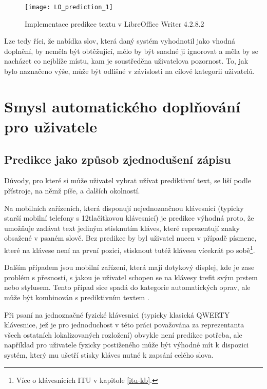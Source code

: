 \documentclass[a4paper,11pt]{article}
\begin{document}
\begin{figure}[h]
	\centering
	\texttt{[image: LO\_prediction\_1]}
	\caption{Implementace predikce textu v LibreOffice Writer 4.2.8.2}
	\label{fig:LOpredict}
\end{figure}

Lze tedy říci, že nabídka slov, která daný systém vyhodnotil jako vhodná doplnění, by neměla být obtěžující, mělo by být snadné ji ignorovat a měla by se nacházet co nejblíže místu, kam je soustředěna uživatelova pozornost. To, jak bylo naznačeno výše, může být odlišné v závislosti na cílové kategorii uživatelů.

\section{Smysl automatického doplňování pro uživatele}

\subsection{Predikce jako způsob zjednodušení zápisu}

Důvody, pro které si může uživatel vybrat užívat prediktivní text, se liší podle přístroje, na němž píše, a dalších okolností.

Na mobilních zařízeních, která disponují nejednoznačnou klávesnicí (typicky starší mobilní telefony s 12tlačítkovou klávesnicí) je predikce výhodná proto, že umožňuje zadávat text jediným stisknutím kláves, které reprezentují znaky obsažené v psaném slově. Bez predikce by byl uživatel nucen v případě písmene, které na klávese není na první pozici, stisknout tutéž klávesu vícekrát po sobě\footnote{Více o klávesnicích ITU v kapitole \ref{itu-kb}.}.

Dalším případem jsou mobilní zařízení, která mají dotykový displej, kde je zase problém s přesností, s jakou je uživatel schopen se na klávesy trefit svým prstem nebo stylusem. Tento případ sice spadá do kategorie automatických oprav, ale může být kombinován s prediktivním textem \parencite{kocienda2012method}. %

Při psaní na jednoznačné fyzické klávesnici (typicky klasická QWERTY klávesnice, jež je pro jednoduchost v této práci považována za reprezentanta všech ostatních lokalizovaných rozložení) obvykle není predikce potřeba, ale například pro uživatele fyzicky postiženého může být výhodné mít k dispozici systém, který mu ušetří stisky kláves nutné k zapsání celého slova.
\end{document}
